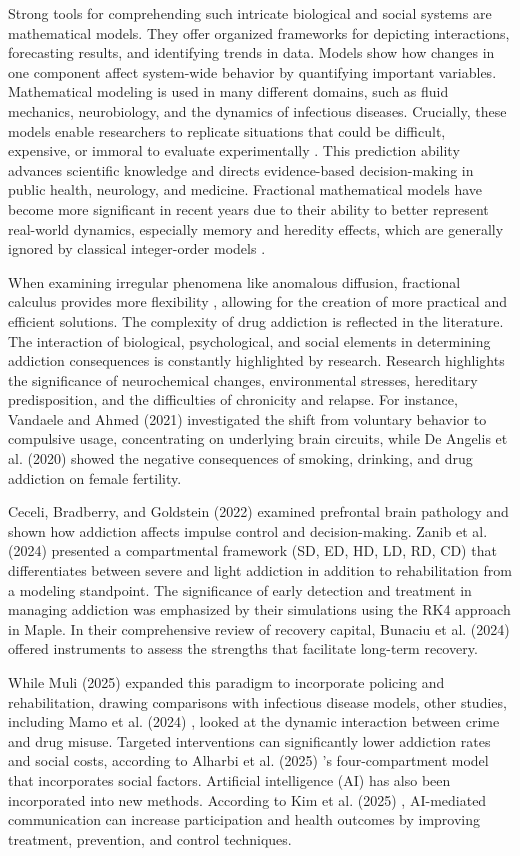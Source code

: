\documentclass[10pt]{NSP1}
\begin{document}
Strong tools for comprehending such intricate biological and social systems are mathematical models. They offer organized frameworks for depicting interactions, forecasting results, and identifying trends in data. Models show how changes in one component affect system-wide behavior by quantifying important variables. Mathematical modeling is used in many different domains, such as fluid mechanics, neurobiology, and the dynamics of infectious diseases. Crucially, these models enable researchers to replicate situations that could be difficult, expensive, or immoral to evaluate experimentally . This prediction ability advances scientific knowledge and directs evidence-based decision-making in public health, neurology, and medicine. Fractional mathematical models have become more significant in recent years due to their ability to better represent real-world dynamics, especially memory and heredity effects, which are generally ignored by classical integer-order models .

When examining irregular phenomena like anomalous diffusion, fractional calculus provides more flexibility , allowing for the creation of more practical and efficient solutions. The complexity of drug addiction is reflected in the literature. The interaction of biological, psychological, and social elements in determining addiction consequences is constantly highlighted by research. Research highlights the significance of neurochemical changes, environmental stresses, hereditary predisposition, and the difficulties of chronicity and relapse. For instance, Vandaele and Ahmed (2021) investigated the shift from voluntary behavior to compulsive usage, concentrating on underlying brain circuits, while De Angelis et al. (2020) showed the negative consequences of smoking, drinking, and drug addiction on female fertility.

Ceceli, Bradberry, and Goldstein (2022) examined prefrontal brain pathology and shown how addiction affects impulse control and decision-making. Zanib et al. (2024) presented a compartmental framework (SD, ED, HD, LD, RD, CD) that differentiates between severe and light addiction in addition to rehabilitation from a modeling standpoint. The significance of early detection and treatment in managing addiction was emphasized by their simulations using the RK4 approach in Maple. In their comprehensive review of recovery capital, Bunaciu et al. (2024) offered instruments to assess the strengths that facilitate long-term recovery.

While Muli (2025) expanded this paradigm to incorporate policing and rehabilitation, drawing comparisons with infectious disease models, other studies, including Mamo et al. (2024) , looked at the dynamic interaction between crime and drug misuse. Targeted interventions can significantly lower addiction rates and social costs, according to Alharbi et al. (2025) ’s four-compartment model that incorporates social factors. Artificial intelligence (AI) has also been incorporated into new methods. According to Kim et al. (2025) , AI-mediated communication can increase participation and health outcomes by improving treatment, prevention, and control techniques.
\end{document}
